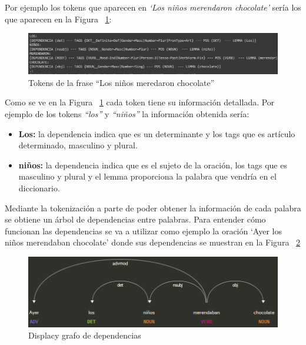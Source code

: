 Por ejemplo los tokens que aparecen en \textit{`Los niños merendaron chocolate'} sería los que aparecen en la Figura ~\ref {fig: tokenInformacion}:
\begin{figure}[h]
	\centering
	\includegraphics[width=1 \textwidth]{Imagenes/Fuentes/PNL/InfoPLN.png}
	\caption{ Tokens de la frase ``Los niños meredaron chocolate'' }
	\label {fig: tokenInformacion}
\end{figure}

Como se ve en la Figura ~\ref {fig: tokenInformacion} cada token tiene su información detallada. Por ejemplo de los tokens \textit{``los''} y \textit{``niños''} la información obtenida sería:
\begin{itemize}
		\item \textbf{Los:} la dependencia indica que es un determinante y los tags que es artículo determinado, masculino y plural. 
		\item \textbf{niños:} la dependencia indica que es el sujeto de la oración, los tags que es masculino y plural y el lemma proporciona la palabra que vendría en el diccionario.  
	
\end{itemize}
 
Mediante la tokenización a parte de poder obtener la información de cada palabra se obtiene un árbol de dependencias entre palabras. Para entender cómo funcionan las dependencias se va a utilizar como ejemplo la oración `Ayer los niños merendaban chocolate' donde sus dependencias se muestran en la Figura ~\ref {fig: dependencias} 

\begin{figure}[h]
	\centering
	\includegraphics[width=1\textwidth]{Imagenes/Fuentes/Text2LSE/dependencias.png}
	\caption{ Displacy grafo de dependencias }
	\label {fig: dependencias}
\end{figure}

